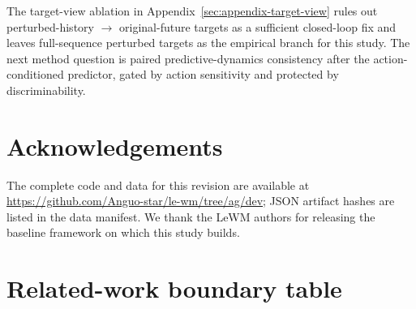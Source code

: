 \documentclass[10pt]{article}
\begin{document}
The target-view ablation in Appendix~\ref{sec:appendix-target-view} rules out perturbed-history $\to$ original-future targets as a sufficient closed-loop fix and leaves full-sequence perturbed targets as the empirical branch for this study. The next method question is paired predictive-dynamics consistency after the action-conditioned predictor, gated by action sensitivity and protected by discriminability.

\section*{Acknowledgements}
The complete code and data for this revision are available at \url{https://github.com/Anguo-star/le-wm/tree/ag/dev}; JSON artifact hashes are listed in the data manifest. We thank the LeWM authors for releasing the baseline framework on which this study builds.




\appendix
\section{Related-work boundary table}\label{sec:appendix-related-boundaries}
\end{document}
